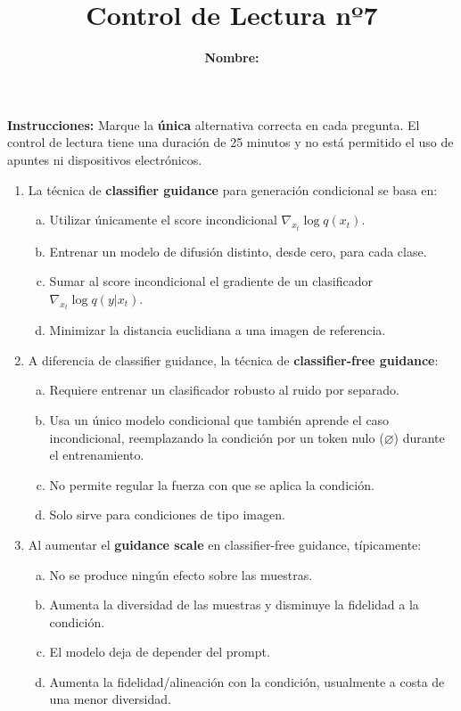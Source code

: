 \documentclass{article}
\title{\bfseries{Control de Lectura nº7}\vspace{0.5cm}}
\author{\textbf{Nombre:} \rule{12cm}{0.4pt}}
\begin{document}
\maketitle

\hspace{-0.5cm}\textbf{Instrucciones:} Marque la \textbf{única} alternativa correcta en cada pregunta. El control de lectura tiene una duración de 25 minutos y no está permitido el uso de apuntes ni dispositivos electrónicos.

\begin{enumerate}[{\bf 1.}]

	\item La técnica de \textbf{classifier guidance} para generación condicional se basa en:
	      \begin{enumerate}[(a)]
		      \item Utilizar únicamente el score incondicional $\nabla_{x_t}\log q(x_t)$.
		      \item Entrenar un modelo de difusión distinto, desde cero, para cada clase.
		      \item Sumar al score incondicional el gradiente de un clasificador $\nabla_{x_t}\log q(y|x_t)$.
		      \item Minimizar la distancia euclidiana a una imagen de referencia.
	      \end{enumerate}

	\item A diferencia de classifier guidance, la técnica de \textbf{classifier-free guidance}:
	      \begin{enumerate}[(a)]
		      \item Requiere entrenar un clasificador robusto al ruido por separado.
		      \item Usa un único modelo condicional que también aprende el caso incondicional, reemplazando la condición por un token nulo ($\varnothing$) durante el entrenamiento.
		      \item No permite regular la fuerza con que se aplica la condición.
		      \item Solo sirve para condiciones de tipo imagen.
	      \end{enumerate}

	\item Al aumentar el \textbf{guidance scale} en classifier-free guidance, típicamente:
	      \begin{enumerate}[(a)]
		      \item No se produce ningún efecto sobre las muestras.
		      \item Aumenta la diversidad de las muestras y disminuye la fidelidad a la condición.
		      \item El modelo deja de depender del prompt.
		      \item Aumenta la fidelidad/alineación con la condición, usualmente a costa de una menor diversidad.
	      \end{enumerate}


\end{enumerate}
\end{document}
